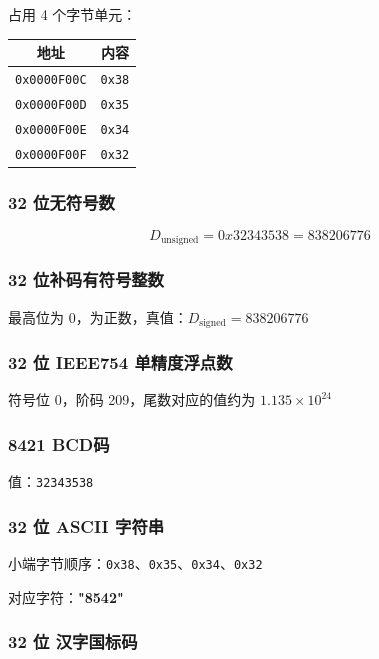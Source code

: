 \documentclass[12pt, a4paper]{academics}
\begin{document}
占用 4 个字节单元：

\begin{center}
\begin{tabular}{|c|c|}
\hline
地址 & 内容 \\
\hline
\texttt{0x0000F00C} & \texttt{0x38} \\
\hline
\texttt{0x0000F00D} & \texttt{0x35} \\
\hline
\texttt{0x0000F00E} & \texttt{0x34} \\
\hline
\texttt{0x0000F00F} & \texttt{0x32} \\
\hline
\end{tabular}
\end{center}

\subsubsection{32 位无符号数}

\[ D_{\text{unsigned}} = 0x32343538 = 838206776 \]

\subsubsection{32 位补码有符号整数}

最高位为 0，为正数，真值：\( D_{\text{signed}} = 838206776 \)

\subsubsection{32 位 IEEE754 单精度浮点数}

符号位 0，阶码 209，尾数对应的值约为 \( 1.135 \times 10^{24} \)

\subsubsection{8421 BCD码}

值：\texttt{32343538}

\subsubsection{32 位 ASCII 字符串}

小端字节顺序：\texttt{0x38}、\texttt{0x35}、\texttt{0x34}、\texttt{0x32}

对应字符：\textbf{"8542"}

\subsubsection{32 位 汉字国标码}
\end{document}
